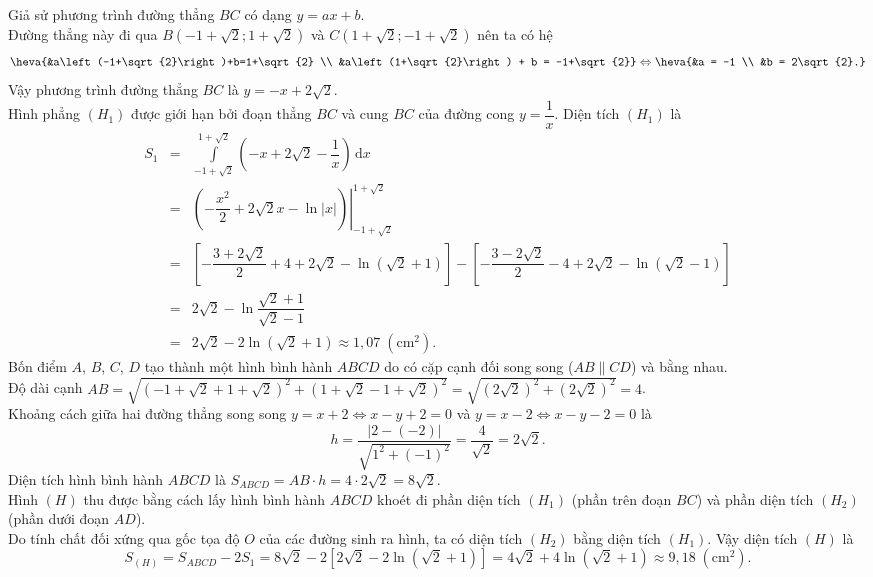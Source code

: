 \begin{ex}
{\begin{itemchoice}
			\itemch Giả sử phương trình đường thẳng $BC$ có dạng $y = ax+b$.\\
			Đường thẳng này đi qua $B\left(-1+\sqrt{2}; 1+\sqrt{2}\right)$ và $C\left(1+\sqrt{2}; -1+\sqrt{2}\right)$ nên ta có hệ
			\[ \heva{&a\left(-1+\sqrt{2}\right)+b=1+\sqrt{2} \\ &a\left(1+\sqrt{2}\right) + b = -1+\sqrt{2}} \Leftrightarrow \heva{&a = -1 \\ &b = 2\sqrt{2}.} \]
			Vậy phương trình đường thẳng $BC$ là $y = -x + 2\sqrt{2}$.\\
			Hình phẳng $(H_1)$ được giới hạn bởi đoạn thẳng $BC$ và cung $BC$ của đường cong $y = \dfrac{1}{x}$. Diện tích $(H_1)$ là
			\allowdisplaybreaks
			\begin{eqnarray*}
				S_1 &=& \int\limits_{-1+\sqrt{2}}^{1+\sqrt{2}} \left( -x + 2\sqrt{2} - \dfrac{1}{x} \right) \mathrm{\,d}x \\
				&=& \left.\left( -\dfrac{x^2}{2} + 2\sqrt{2}x - \ln|x| \right)\right|_{-1+\sqrt{2}}^{1+\sqrt{2}} \\
				&=& \left[-\dfrac{3+2\sqrt{2}}{2} + 4 + 2\sqrt{2} - \ln\left(\sqrt{2}+1\right)\right]- \left[-\dfrac{3-2\sqrt{2}}{2} - 4 + 2\sqrt{2} - \ln(\sqrt{2}-1)\right]\\
				&=& 2\sqrt{2} - \ln\dfrac{\sqrt{2}+1}{\sqrt{2}-1}\\
				& =& 2\sqrt{2} - 2\ln\left(\sqrt{2}+1\right)\approx 1{,}07 \;\left(\text{cm}^2\right).
			\end{eqnarray*}
			\itemch Bốn điểm $A$, $B$, $C$, $D$ tạo thành một hình bình hành $ABCD$ do có cặp cạnh đối song song ($AB \parallel CD$) và bằng nhau.\\
			Độ dài cạnh $AB = \sqrt{\left(-1+\sqrt{2} + 1 + \sqrt{2}\right)^2 + \left(1+\sqrt{2} - 1 + \sqrt{2}\right)^2} = \sqrt{\left(2\sqrt{2}\right)^2 + \left(2\sqrt{2}\right)^2} = 4$.\\
			Khoảng cách giữa hai đường thẳng song song $y=x+2 \Leftrightarrow x-y+2=0$ và $y=x-2 \Leftrightarrow x-y-2=0$ là
			\[ h = \dfrac{|2 - (-2)|}{\sqrt{1^2+(-1)^2}} = \dfrac{4}{\sqrt{2}} = 2\sqrt{2}. \]
			Diện tích hình bình hành $ABCD$ là $S_{ABCD} = AB \cdot h = 4 \cdot 2\sqrt{2} = 8\sqrt{2}$.\\
			Hình $(H)$ thu được bằng cách lấy hình bình hành $ABCD$ khoét đi phần diện tích $(H_1)$ (phần trên đoạn $BC$) và phần diện tích $(H_2)$ (phần dưới đoạn $AD$). \\
			Do tính chất đối xứng qua gốc tọa độ $O$ của các đường sinh ra hình, ta có diện tích $(H_2)$ bằng diện tích $(H_1)$. Vậy diện tích $(H)$ là
			\[ S_{(H)} = S_{ABCD} - 2S_1 = 8\sqrt{2} - 2\left[2\sqrt{2} - 2\ln\left(\sqrt{2}+1\right)\right] = 4\sqrt{2} + 4\ln\left(\sqrt{2}+1\right)\approx9{,}18\;\left(\text{cm}^2\right). \]
		\end{itemchoice}
	}
\end{ex}
